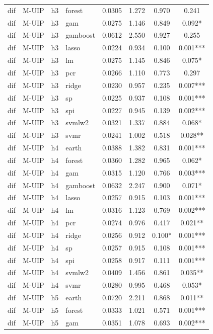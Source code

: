 \begin{ThreePartTable}
\begin{longtable}[t]{llclcccc}
dif & M-UIP & h3 & forest & 0.0305 & 1.272 & 0.970 & 0.241\\
dif & M-UIP & h3 & gam & 0.0275 & 1.146 & 0.849 & 0.092*\\
dif & M-UIP & h3 & gamboost & 0.0612 & 2.550 & 0.927 & 0.255\\
dif & M-UIP & h3 & lasso & 0.0224 & 0.934 & 0.100 & 0.001***\\
dif & M-UIP & h3 & lm & 0.0275 & 1.145 & 0.846 & 0.075*\\
dif & M-UIP & h3 & pcr & 0.0266 & 1.110 & 0.773 & 0.297\\
dif & M-UIP & h3 & ridge & 0.0230 & 0.957 & 0.235 & 0.007***\\
dif & M-UIP & h3 & sp & 0.0225 & 0.937 & 0.108 & 0.001***\\
dif & M-UIP & h3 & spi & 0.0227 & 0.945 & 0.139 & 0.002***\\
dif & M-UIP & h3 & svmlw2 & 0.0321 & 1.337 & 0.884 & 0.068*\\
dif & M-UIP & h3 & svmr & 0.0241 & 1.002 & 0.518 & 0.028**\\
\addlinespace
dif & M-UIP & h4 & earth & 0.0388 & 1.382 & 0.831 & 0.001***\\
dif & M-UIP & h4 & forest & 0.0360 & 1.282 & 0.965 & 0.062*\\
dif & M-UIP & h4 & gam & 0.0315 & 1.120 & 0.766 & 0.003***\\
dif & M-UIP & h4 & gamboost & 0.0632 & 2.247 & 0.900 & 0.071*\\
dif & M-UIP & h4 & lasso & 0.0257 & 0.915 & 0.103 & 0.001***\\
dif & M-UIP & h4 & lm & 0.0316 & 1.123 & 0.769 & 0.002***\\
dif & M-UIP & h4 & pcr & 0.0274 & 0.976 & 0.417 & 0.021**\\
dif & M-UIP & h4 & ridge & 0.0256 & 0.912 & 0.100* & 0.001***\\
dif & M-UIP & h4 & sp & 0.0257 & 0.915 & 0.108 & 0.001***\\
dif & M-UIP & h4 & spi & 0.0258 & 0.917 & 0.111 & 0.001***\\
dif & M-UIP & h4 & svmlw2 & 0.0409 & 1.456 & 0.861 & 0.035**\\
dif & M-UIP & h4 & svmr & 0.0280 & 0.995 & 0.468 & 0.053*\\
\addlinespace
dif & M-UIP & h5 & earth & 0.0720 & 2.211 & 0.868 & 0.011**\\
dif & M-UIP & h5 & forest & 0.0333 & 1.021 & 0.571 & 0.001***\\
dif & M-UIP & h5 & gam & 0.0351 & 1.078 & 0.693 & 0.002***\\

\end{longtable}
\end{ThreePartTable}

